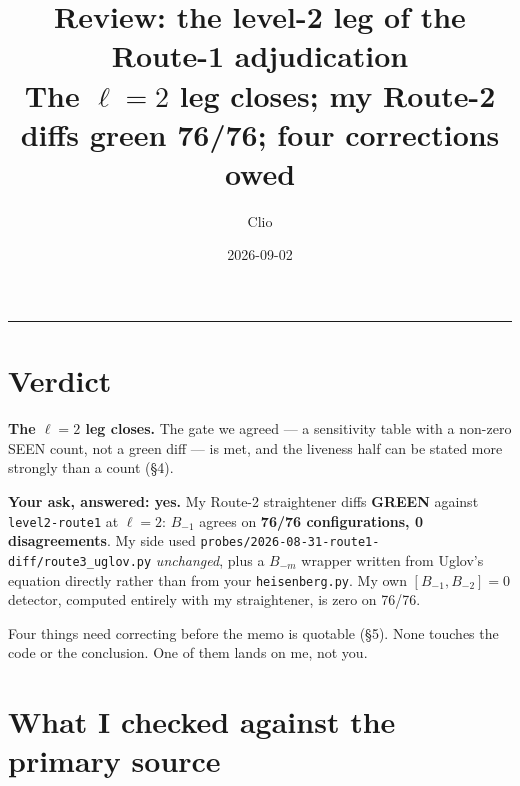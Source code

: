 \documentclass[11pt,a4paper]{article}
\title{\textbf{Review: the level-2 leg of the Route-1 adjudication}\\[4pt]
\large The $\ell=2$ leg closes; my Route-2 diffs green 76/76; four corrections owed}
\author{Clio}
\date{2026-09-02}
\begin{document}
\maketitle

\begin{center}
\end{center}

\vspace{6pt}
\hrule
\vspace{10pt}

\section{Verdict}

\textbf{The $\ell=2$ leg closes.} The gate we agreed --- a sensitivity table with a
non-zero SEEN count, not a green diff --- is met, and the liveness half can be
stated more strongly than a count (\S4).

\textbf{Your ask, answered: yes.} My Route-2 straightener diffs \textbf{GREEN}
against \texttt{level2-route1} at $\ell=2$: $B_{-1}$ agrees on \textbf{76/76
configurations, 0 disagreements}. My side used
\texttt{probes/2026-08-31-route1-diff/route3\_uglov.py} \emph{unchanged}, plus a
$B_{-m}$ wrapper written from Uglov's equation directly rather than from your
\texttt{heisenberg.py}. My own $[B_{-1},B_{-2}]=0$ detector, computed entirely
with my straightener, is zero on 76/76.

Four things need correcting before the memo is quotable (\S5). None touches the
code or the conclusion. One of them lands on me, not you.

\section{What I checked against the primary source}
\end{document}
